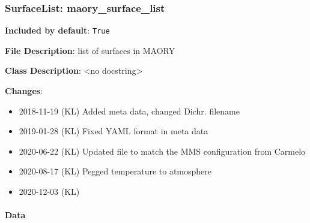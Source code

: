 \subsubsection{SurfaceList: \textquotedbl{}maory\_surface\_list\textquotedbl{}%
  \label{surfacelist-maory-surface-list}%
}

\textbf{Included by default}: \texttt{True}

\textbf{File Description}: list of surfaces in MAORY

\textbf{Class Description}: <no docstring>

\textbf{Changes}:

\begin{itemize}
\item 2018-11-19 (KL) Added meta data, changed Dichr. filename

\item 2019-01-28 (KL) Fixed YAML format in meta data

\item 2020-06-22 (KL) Updated file to match the MMS configuration from Carmelo

\item 2020-08-17 (KL) Pegged temperature to atmosphere

\item 2020-12-03 (KL)
\end{itemize}


\paragraph{Data%
  \label{data}%
}

\begin{figure}[H]
\noindent{}\label{fig-maory-surface-list}
\end{figure}

